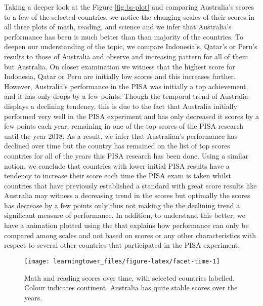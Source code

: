 Taking a deeper look at the Figure \ref{fig:bs-plot} and comparing Australia's scores to a few of the selected countries, we notice the changing scales of their scores in all three plots of math, reading, and science and we infer that Australia's performance has been is much better than than majority of the countries. To deepen our understanding of the topic, we compare Indonesia's, Qatar's or Peru's results to those of Australia and observe and increasing pattern for all of them but Australia. On closer examination we witness that the highest score for Indonesia, Qatar or Peru are initially low scores and this increases further. However, Australia's performance in the PISA was initially a top achievement, and it has only drops by a few points. Though the temporal trend of Australia displays a declining tendency, this is due to the fact that Australia initially performed very well in the PISA experiment and has only decreased it scores by a few points each year, remaining in one of the top scores of the PISA research until the year 2018. As a result, we infer that Australian's performance has declined over time but the country has remained on the list of top scores countries for all of the years this PISA research has been done. Using a similar notion, we conclude that countries with lower initial PISA results have a tendency to increase their score each time the PISA exam is taken whilst countries that have previously established a standard with great score results like Australia may witness a decreasing trend in the scores but optimally the scores has decrease by a few points only thus not making the the declining trend a significant measure of performance. In addition, to understand this better, we have a animation plotted using  \citep{gganimate} the that explains how performance can only be compared among scales and not based on scores or any other characteristics with respect to several other countries that participated in the PISA experiment.

\begin{figure}
\texttt{[image: learningtower\_files/figure-latex/facet-time-1]} \caption{Math and reading scores over time, with selected countries labelled. Colour indicates continent. Australia has quite stable scores over the years.}\label{fig:facet-time}
\end{figure}

